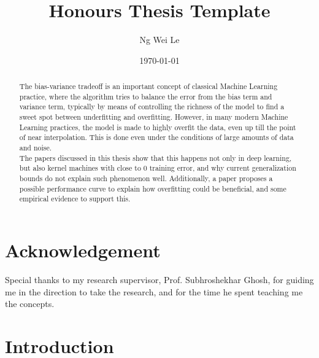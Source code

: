 \documentclass[twoside]{memoir}
\title{Honours Thesis Template}
\author{Ng Wei Le}
\date{\today}
\begin{document}
	\frontmatter
	
	
\maketitle

\chapter{Acknowledgement}
Special thanks to my research supervisor, Prof. Subhroshekhar Ghosh, for guiding me in the direction to take the research, and for the time he spent teaching me the concepts.
	
\begin{abstract}
	The bias-variance tradeoff is an important concept of classical Machine Learning practice, where the algorithm tries to balance the error from the bias term and variance term, typically by means of controlling the richness of the model to find a sweet spot between underfitting and overfitting. However, in many modern Machine Learning practices, the model is made to highly overfit the data, even up till the point of near interpolation. This is done even under the conditions of large amounts of data and noise.\\
	The papers discussed in this thesis show that this happens not only in deep learning, but also kernel machines with close to 0 training error, and why current generalization bounds do not explain such phenomenon well. Additionally, a paper proposes a possible performance curve to explain how overfitting could be beneficial, and some empirical evidence to support this.
\end{abstract}
	
\tableofcontents

\listoffigures*

\mainmatter

\chapter{Introduction}
\end{document}
